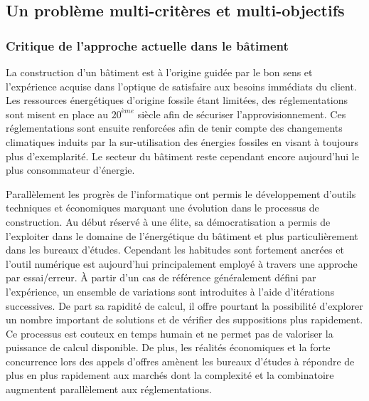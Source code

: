 


\subsection{Un problème multi-critères et multi-objectifs} %
\label{sub:un_probleme_multi_criteres_et_multi_objectifs}
\subsubsection{Critique de l’approche actuelle dans le bâtiment} %
\label{ssub:critique_de_l_approche_actuelle_dans_le_batiment}
La construction d’un bâtiment est à l’origine guidée par le bon sens et l’expérience
acquise dans l’optique de satisfaire aux besoins immédiats du client.
Les ressources énergétiques d’origine fossile étant limitées, des
réglementations sont misent en place au $20^{ème}$ siècle afin de sécuriser
l’approvisionnement. Ces réglementations sont ensuite renforcées afin de tenir
compte des changements climatiques induits par la sur-utilisation des énergies
fossiles en visant à toujours plus d’exemplarité. Le secteur du bâtiment reste
cependant encore aujourd’hui le plus consommateur d’énergie.

Parallèlement les progrès de l’informatique ont permis le développement d’outils
techniques et économiques marquant une évolution dans le processus de construction. Au
début réservé à une élite, sa démocratisation a permis de l’exploiter dans le domaine de
l’énergétique du bâtiment et plus particulièrement dans les bureaux d’études. Cependant
les habitudes sont fortement ancrées et l’outil numérique est aujourd’hui principalement
employé à travers une approche par essai/erreur. À partir d’un cas de référence
généralement défini par l’expérience, un ensemble de variations sont introduites à l’aide
d’itérations successives. De part sa rapidité de calcul, il offre pourtant la possibilité
d’explorer un nombre important de solutions et de vérifier des suppositions plus
rapidement. Ce processus est couteux en temps humain et ne permet pas de valoriser la
puissance de calcul disponible. De plus, les réalités économiques et la forte concurrence
lors des appels d’offres amènent les bureaux d’études à répondre de plus en plus
rapidement aux marchés dont la complexité et la combinatoire augmentent parallèlement aux
réglementations.

